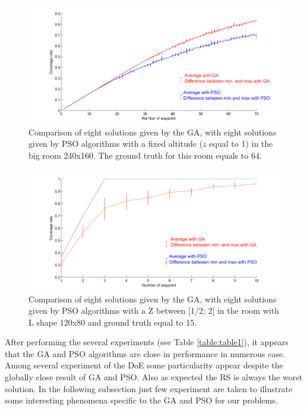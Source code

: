 \begin{figure}[!]
  \includegraphics[width=\linewidth]{img/fig8.png}
  \caption{ Comparison of eight solutions given by the GA, with eight solutions given by PSO algorithms with a fixed altitude ($z$ equal to 1) in the big room 240x160. The ground truth for this room equals to 64.}\label{fig:bigRz1}
   \endminipage\hfill
\end{figure}
%
%
\begin{figure}[!]
  \includegraphics[width=\linewidth]{img/fig9.png}
  \caption{Comparison of eight solutions given by the GA, with eight solutions given by PSO algorithms with a Z between [1/2; 2] in the room with L shape 120x80 and ground truth equal to 15.}\label{fig:RLz2}
   \endminipage\hfill
\end{figure}
After performing the several experiments (see Table \ref{table:table1}), it appears that the GA and PSO algorithms are close in performance in numerous case. Among several experiment of the DoE some particularity appear despite the globally close result of GA and PSO. Also as expected the RS is always the worst solution.
 In the following subsection  just few experiment are taken to illustrate some interesting phenomena specific to the GA and PSO for our problems.

